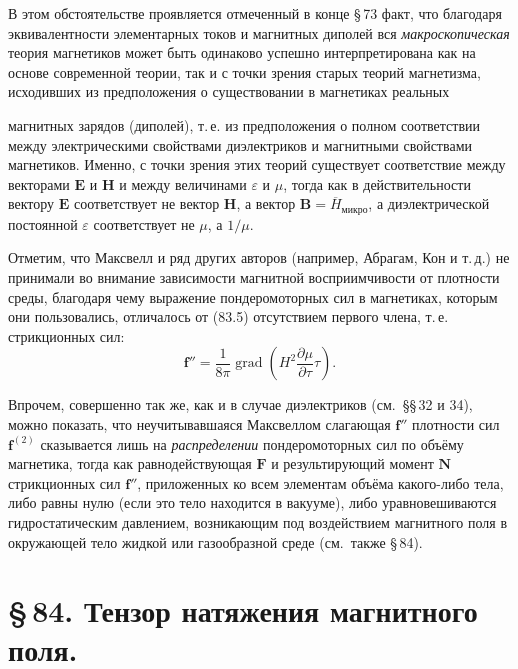 \documentclass[a4paper,10pt]{article}
\begin{document}
В этом обстоятельстве проявляется отмеченный в конце §\,73 факт,
что благодаря эквивалентности элементарных токов и магнитных диполей
вся \textit{макроскопическая} теория магнетиков может быть одинаково
успешно интерпретирована как на основе современной теории, так и с
точки зрения старых теорий магнетизма, исходивших из предположения
о существовании в магнетиках реальных


магнитных зарядов (диполей), т.\,е. из предположения о полном
соответствии между электрическими свойствами диэлектриков и магнитными
свойствами магнетиков. Именно, с точки зрения этих теорий существует
соответствие между векторами $\mathbf{E}$ и $\mathbf{H}$ и между
величинами $\varepsilon$ и $\mu$, тогда как в действительности вектору
$\mathbf{E}$ соответствует не вектор $\mathbf{H}$, а вектор
$\mathbf{B} = \overline{H}_{\text{микро}}$, а диэлектрической постоянной
$\varepsilon$ соответствует не $\mu$, а $1/\mu$.

Отметим, что Максвелл и ряд других авторов (например, Абрагам, Кон
и т.\,д.) не принимали во внимание зависимости магнитной восприимчивости
от плотности среды, благодаря чему выражение пондеромоторных сил
в магнетиках, которым они пользовались, отличалось от (83.5) отсутствием
первого члена, т.\,е. стрикционных сил:
\begin{equation}
    \mathbf{f}'' = \frac{1}{8\pi}\operatorname{grad}\!\left(
        H^2\frac{\partial\mu}{\partial\tau}\tau
    \right).
    \tag{83.6}
\end{equation}

Впрочем, совершенно так же, как и в случае диэлектриков (см.\ §§\,32
и 34), можно показать, что неучитывавшаяся Максвеллом слагающая
$\mathbf{f}''$ плотности сил $\mathbf{f}^{(2)}$ сказывается лишь на
\textit{распределении} пондеромоторных сил по объёму магнетика, тогда
как равнодействующая $\mathbf{F}$ и результирующий момент $\mathbf{N}$
стрикционных сил $\mathbf{f}''$, приложенных ко всем элементам объёма
какого-либо тела, либо равны нулю (если это тело находится в вакууме),
либо уравновешиваются гидростатическим давлением, возникающим под
воздействием магнитного поля в окружающей тело жидкой или газообразной
среде (см.\ также §\,84).


\section*{\S\,84. Тензор натяжения магнитного поля.}
\end{document}
